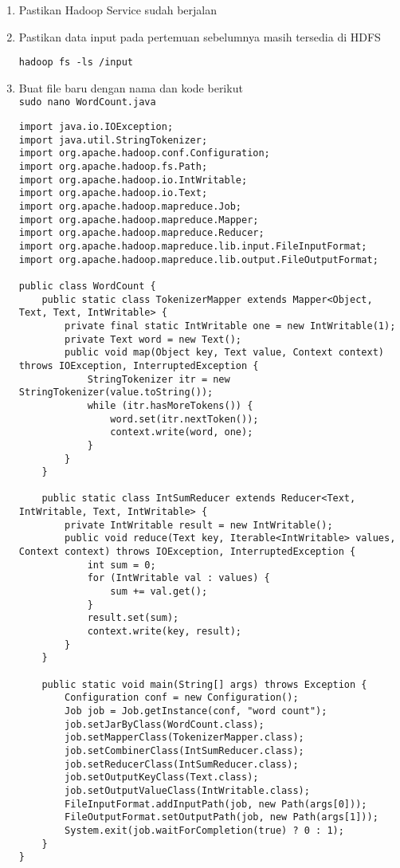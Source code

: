 \documentclass[a4paper]{tufte-handout}
\begin{document}
\begin{enumerate}
\item Pastikan Hadoop Service sudah berjalan
\item Pastikan data input pada pertemuan sebelumnya masih tersedia di HDFS

{\tt hadoop fs -ls /input}

\item Buat file baru dengan nama dan kode berikut \\

{\tt sudo nano WordCount.java}
\begin{lstlisting}
import java.io.IOException;
import java.util.StringTokenizer;
import org.apache.hadoop.conf.Configuration;
import org.apache.hadoop.fs.Path;
import org.apache.hadoop.io.IntWritable;
import org.apache.hadoop.io.Text;
import org.apache.hadoop.mapreduce.Job;
import org.apache.hadoop.mapreduce.Mapper;
import org.apache.hadoop.mapreduce.Reducer;
import org.apache.hadoop.mapreduce.lib.input.FileInputFormat;
import org.apache.hadoop.mapreduce.lib.output.FileOutputFormat;

public class WordCount {
	public static class TokenizerMapper extends Mapper<Object, Text, Text, IntWritable> {
    	private final static IntWritable one = new IntWritable(1);
        private Text word = new Text();
        public void map(Object key, Text value, Context context) throws IOException, InterruptedException {
            StringTokenizer itr = new StringTokenizer(value.toString());
            while (itr.hasMoreTokens()) {
                word.set(itr.nextToken());
                context.write(word, one);
            }
        }
    }

    public static class IntSumReducer extends Reducer<Text, IntWritable, Text, IntWritable> {
        private IntWritable result = new IntWritable();
        public void reduce(Text key, Iterable<IntWritable> values, Context context) throws IOException, InterruptedException {
            int sum = 0;
            for (IntWritable val : values) {
                sum += val.get();
            }
            result.set(sum);
            context.write(key, result);
        }
    }

    public static void main(String[] args) throws Exception {
        Configuration conf = new Configuration();
        Job job = Job.getInstance(conf, "word count");
        job.setJarByClass(WordCount.class);
        job.setMapperClass(TokenizerMapper.class);
        job.setCombinerClass(IntSumReducer.class);
        job.setReducerClass(IntSumReducer.class);
        job.setOutputKeyClass(Text.class);
        job.setOutputValueClass(IntWritable.class);
        FileInputFormat.addInputPath(job, new Path(args[0]));
        FileOutputFormat.setOutputPath(job, new Path(args[1]));
        System.exit(job.waitForCompletion(true) ? 0 : 1);
    }
}
\end{lstlisting}


\end{enumerate}
\end{document}
